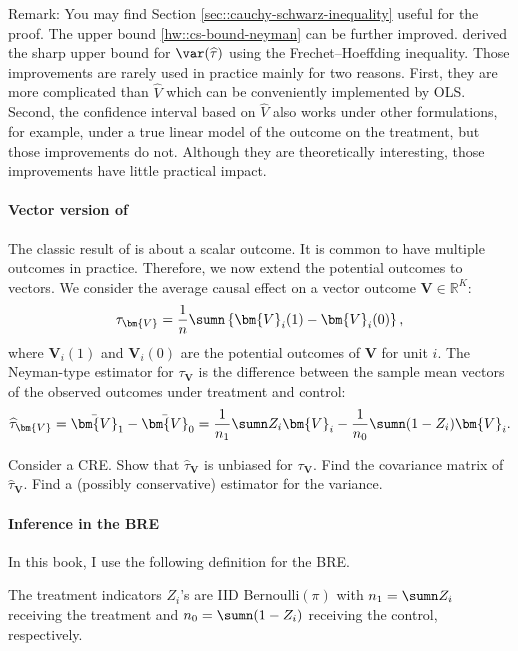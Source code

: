 Remark: 
You may find Section \ref{sec::cauchy-schwarz-inequality} useful for the proof. 
The upper bound \eqref{hw::cs-bound-neyman} can be further improved. 
\citet{aronow2014sharp} derived the sharp upper bound for $\var(\widehat{\tau}) $ using the Frechet--Hoeffding inequality. Those improvements are rarely used in practice mainly for two reasons. First, they are more complicated than $\hat{V}$ which can be conveniently implemented by OLS. Second, the confidence interval based on  $\hat{V}$ also works under other formulations, for example, under a true linear model of the outcome on the treatment, but those improvements do not. Although they are theoretically interesting, those improvements have little practical impact. 
 


\paragraph{Vector version of \citet{Neyman:1923}} \label{hw::vector-neyman1923}

The classic result of \citet{Neyman:1923} is about a scalar outcome. It is common to have multiple outcomes in practice. Therefore, we now extend the potential outcomes to vectors. We consider the average causal effect on a vector outcome $\bm{V}  \in \mathbb{R}^K$: 
$$
\tau_{\bm{V}} = \frac{1}{n}  \sumn \left\{  \bm{V}_i(1) - \bm{V}_i(0) \right\},
$$
where $\bm{V}_i(1)$ and $\bm{V}_i(0)$ are the potential outcomes of $\bm{V}$ for unit $i$. 
The Neyman-type estimator for $\tau_{\bm{V}}$ is the difference between the sample mean vectors of the observed outcomes under treatment and control:
$$
\widehat{ \tau}_{\bm{V}} = \bar{\bm{V}}_1  - \bar{\bm{V}}_0 
= \frac{1}{n_1}   \sumn Z_i  \bm{V}_i   - \frac{1}{n_0}  \sumn (1-Z_i) \bm{V}_i . 
$$


Consider a CRE. Show that $\widehat{ \tau}_{\bm{V}} $ is unbiased for $\tau_{\bm{V}} $. Find the covariance matrix of $\widehat{ \tau}_{\bm{V}} $. Find a (possibly conservative) estimator for the variance. 


\paragraph{Inference in the BRE}\label{hw::bre-inference}


In this book, I use the following definition for the BRE. 

\begin{definition}
[BRE]\label{def::BRE}
The treatment indicators $Z_i$'s are IID Bernoulli$(\pi)$ with $n_1 = \sumn Z_i$ receiving the treatment and $n_0 = \sumn (1-Z_i)$ receiving the control, respectively. 
\end{definition}



